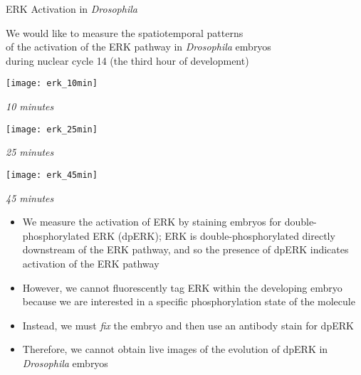 \begin{frame}{ERK Activation in {\em Drosophila}}

	We would like to measure the spatiotemporal patterns \\
	of the activation of the ERK pathway in {\em Drosophila} embryos\\
	during nuclear cycle 14 (the third hour of development)

    \centering
	\begin{minipage}{0.3\textwidth}
	    \texttt{[image: erk\_10min]}\\
	    {\scriptsize \em 10 minutes \par}
	\end{minipage}
	\begin{minipage}{0.3\textwidth}
	    \texttt{[image: erk\_25min]}\\
	    {\scriptsize \em 25 minutes \par}
	\end{minipage}
	\begin{minipage}{0.3\textwidth}
	    \texttt{[image: erk\_45min]}\\
	    {\scriptsize \em 45 minutes \par}
	\end{minipage}
	
	\begin{itemize}
		\item We measure the activation of ERK by staining embryos for double-phosphorylated ERK (dpERK); ERK is double-phosphorylated  directly downstream of the ERK pathway, and so the presence of dpERK indicates activation of the ERK pathway
	
		\item However, we cannot fluorescently tag ERK within the developing embryo because we are interested in a specific phosphorylation state of the molecule
		
		\item Instead, we must {\em fix} the embryo and then use an antibody stain for dpERK
	
		\item Therefore, we cannot obtain live images of the evolution of dpERK in {\em Drosophila} embryos
	\end{itemize}
	
\end{frame}

